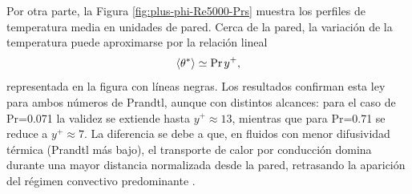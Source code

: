 Por otra parte, la Figura \ref{fig:plus-phi-Re5000-Prs} muestra los perfiles de temperatura media en unidades de pared. Cerca de la pared, la variación de la temperatura puede aproximarse por la relación lineal \cite{kawamura1998dns}
\begin{equation*}
\langle \theta^* \rangle \simeq \text{Pr}\hspace{0.5mm} y^+ ,
\end{equation*}
representada en la figura con líneas negras. Los resultados confirman esta ley para ambos números de Prandtl, aunque con distintos alcances: para el caso de Pr=0.071 la validez se extiende hasta $y^{+}\approx 13$, mientras que para Pr=0.71 se reduce a $y^{+}\approx 7$. La diferencia se debe a que, en fluidos con menor difusividad térmica (Prandtl más bajo), el transporte de calor por conducción domina durante una mayor distancia normalizada desde la pared, retrasando la aparición del régimen convectivo predominante \cite{abregu2023dns}.






%
%
%
%
%
%



